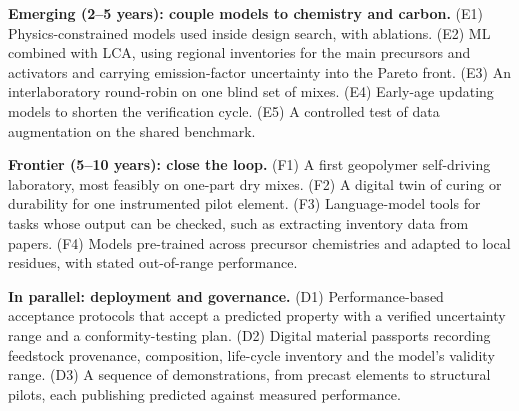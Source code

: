 \documentclass[pdflatex,sn-basic]{sn-jnl}
\begin{document}
\textbf{Emerging (2--5 years): couple models to chemistry and carbon.} (E1) Physics-constrained models used inside design search, with ablations. (E2) ML combined with LCA, using regional inventories for the main precursors and activators and carrying emission-factor uncertainty into the Pareto front. (E3) An interlaboratory round-robin on one blind set of mixes. (E4) Early-age updating models to shorten the verification cycle. (E5) A controlled test of data augmentation on the shared benchmark.

\textbf{Frontier (5--10 years): close the loop.} (F1) A first geopolymer self-driving laboratory, most feasibly on one-part dry mixes. (F2) A digital twin of curing or durability for one instrumented pilot element. (F3) Language-model tools for tasks whose output can be checked, such as extracting inventory data from papers. (F4) Models pre-trained across precursor chemistries and adapted to local residues, with stated out-of-range performance.

\textbf{In parallel: deployment and governance.} (D1) Performance-based acceptance protocols that accept a predicted property with a verified uncertainty range and a conformity-testing plan. (D2) Digital material passports recording feedstock provenance, composition, life-cycle inventory and the model's validity range. (D3) A sequence of demonstrations, from precast elements to structural pilots, each publishing predicted against measured performance.
\end{document}
